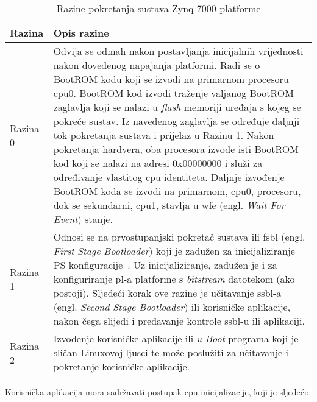\documentclass[times, utf8, diplomski, numeric]{fer}
\begin{document}
\begin{table}[H]
  \centering
  \caption{Razine pokretanja sustava Zynq-7000 platforme}
  \label{boot_stages}
  \begin{tabular}{|| p{2cm} | p{12cm} ||}
    \hline
    \textbf{Razina} & \textbf{Opis razine} \\
    \hline\hline
    Razina 0 & Odvija se odmah nakon postavljanja inicijalnih vrijednosti nakon dovedenog napajanja platformi.
    Radi se o BootROM kodu koji se izvodi na primarnom procesoru \gls{cpu}0. BootROM kod izvodi traženje valjanog
    BootROM zaglavlja koji se nalazi u \textit{flash} memoriji uređaja s kojeg se pokreće sustav. Iz navedenog
    zaglavlja se određuje daljnji tok pokretanja sustava i prijelaz u Razinu 1. Nakon pokretanja hardvera, oba
    procesora izvode isti BootROM kod koji se nalazi na adresi 0x00000000 i služi za određivanje vlastitog
    \gls{cpu} identiteta. Daljnje izvođenje BootROM koda se izvodi na primarnom, \gls{cpu}0, procesoru, dok se sekundarni, \gls{cpu}1,
    stavlja u \gls{wfe} (engl. \textit{Wait For Event}) stanje.\\
    \hline
    Razina 1 & Odnosi se na prvostupanjski pokretač sustava ili \gls{fsbl} (engl. \textit{First Stage Bootloader}) koji
    je zadužen za inicijaliziranje PS konfiguracije~\cite{zynq_swdg}. Uz inicijaliziranje, zadužen je i za konfiguriranje \gls{pl}-a
    platforme s \textit{bitstream} datotekom (ako postoji). Sljedeći korak ove razine je učitavanje \gls{ssbl}-a (engl.
    \textit{Second Stage Bootloader}) ili korisničke aplikacije, nakon čega slijedi i predavanje kontrole \gls{ssbl}-u
    ili aplikaciji.\\
    \hline
    Razina 2 & Izvođenje korisničke aplikacije ili \textit{u-Boot} programa koji je sličan Linuxovoj ljusci te može
    poslužiti za učitavanje i pokretanje korisničke aplikacije.\\
    \hline
  \end{tabular}
\end{table}
\newpage
\noindent
Korisnička aplikacija mora sadržavati postupak \gls{cpu} inicijalizacije, koji je sljedeći:
\end{document}
